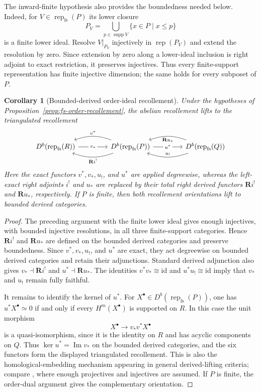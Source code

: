\documentclass[12pt,reqno]{amsart}
\newtheorem{corollary}[theorem]{Corollary}
\theoremstyle{definition}
\theoremstyle{remark}
\newcommand{\Rep}{\operatorname{rep}}
\begin{document}
The inward-finite hypothesis also provides the boundedness needed below.
Indeed, for $V\in\Rep_{\mathrm{fs}}(P)$ its lower closure
\[
P_V=\bigcup_{p\in\operatorname{supp}V}\{x\in P\mid x\le p\}
\]
is a finite lower ideal.  Resolve $V|_{P_V}$ injectively in $\Rep(P_V)$ and
extend the resolution by zero.  Since extension by zero along a lower-ideal
inclusion is right adjoint to exact restriction, it preserves injectives.
Thus every finite-support representation has finite injective dimension; the
same holds for every subposet of $P$.

\begin{corollary}[Bounded-derived order-ideal recollement]
\label{cor:fs-derived-recollement}
Under the hypotheses of Proposition~\ref{prop:fs-order-recollement}, the
abelian recollement lifts to the triangulated recollement
\[
\begin{tikzcd}[column sep=4.2em]
D^b\!\left(\Rep_{\mathrm{fs}}(R)\right)
  \arrow[r, "v_*" description]
& D^b\!\left(\Rep_{\mathrm{fs}}(P)\right)
  \arrow[l, bend right=20, "v^*"']
  \arrow[l, bend left=20, "\mathbf R i^!"]
  \arrow[r, "u^*" description]
& D^b\!\left(\Rep_{\mathrm{fs}}(Q)\right)
  \arrow[l, bend left=20, "u_!"']
  \arrow[l, bend right=20, "\mathbf R u_*"]
\end{tikzcd}
\]
Here the exact functors $v^*,v_*,u_!$, and $u^*$ are applied degreewise,
whereas the left-exact right adjoints $i^!$ and $u_*$ are replaced by their
total right derived functors $\mathbf R i^!$ and $\mathbf R u_*$,
respectively.  If $P$ is finite, then both recollement orientations lift to
bounded derived categories.
\end{corollary}

\begin{proof}
The preceding argument with the finite lower ideal gives enough injectives, with
bounded injective resolutions, in all three finite-support categories.  Hence
$\mathbf R i^!$ and $\mathbf R u_*$ are defined on the bounded derived
categories and preserve boundedness.  Since $v^*,v_*,u_!$, and $u^*$ are
exact, they act degreewise on bounded derived categories and retain their
adjunctions.  Standard derived adjunction also gives
$v_*\dashv\mathbf R i^!$ and $u^*\dashv\mathbf R u_*$.  The identities
$v^*v_*\cong\mathrm{id}$ and $u^*u_!\cong\mathrm{id}$ imply that $v_*$ and
$u_!$ remain fully faithful.

It remains to identify the kernel of $u^*$.  For
$X^\bullet\in D^b(\Rep_{\mathrm{fs}}(P))$, one has $u^*X^\bullet\simeq0$
if and only if every $H^m(X^\bullet)$ is supported on $R$.  In this case the
unit morphism
\[
X^\bullet\longrightarrow v_*v^*X^\bullet
\]
is a quasi-isomorphism, since it is the identity on $R$ and has acyclic
components on $Q$.  Thus
$\ker u^*=\operatorname{Im}v_*$ on the bounded derived categories, and the six
functors form the displayed triangulated recollement.  This is also the
homological-embedding mechanism appearing in general derived-lifting criteria;
compare \cite[Theorem~7.2]{Psaroudakis}, where enough projectives and
injectives are assumed.  If $P$ is finite, the order-dual argument gives the
complementary orientation.
\end{proof}
\end{document}
